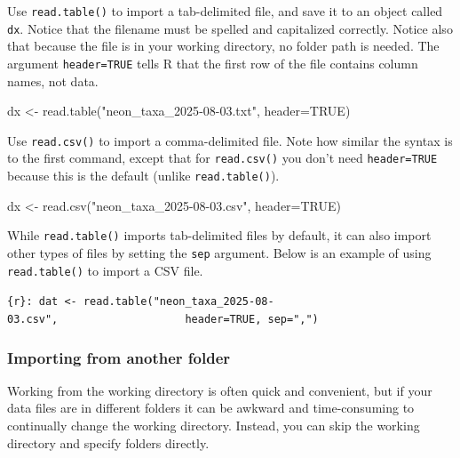 \documentclass[
  13,
  letterpaper,
]{report}
\newenvironment{Shaded}{\begin{snugshade}}{\end{snugshade}}
\newcommand{\AttributeTok}[1]{\textcolor[rgb]{0.40,0.45,0.13}{#1}}
\newcommand{\ConstantTok}[1]{\textcolor[rgb]{0.56,0.35,0.01}{#1}}
\newcommand{\FunctionTok}[1]{\textcolor[rgb]{0.28,0.35,0.67}{#1}}
\newcommand{\NormalTok}[1]{\textcolor[rgb]{0.00,0.23,0.31}{#1}}
\newcommand{\OtherTok}[1]{\textcolor[rgb]{0.00,0.23,0.31}{#1}}
\newcommand{\StringTok}[1]{\textcolor[rgb]{0.13,0.47,0.30}{#1}}
\begin{document}
Use \texttt{read.table()} to import a tab-delimited file, and save it to
an object called \texttt{dx}. Notice that the filename must be spelled
and capitalized correctly. Notice also that because the file is in your
working directory, no folder path is needed. The argument
\texttt{header=TRUE} tells R that the first row of the file contains
column names, not data.

\begin{Shaded}
\begin{Highlighting}[]
\NormalTok{dx }\OtherTok{\textless{}{-}} \FunctionTok{read.table}\NormalTok{(}\StringTok{"neon\_taxa\_2025{-}08{-}03.txt"}\NormalTok{, }\AttributeTok{header=}\ConstantTok{TRUE}\NormalTok{)}
\end{Highlighting}
\end{Shaded}

Use \texttt{read.csv()} to import a comma-delimited file. Note how
similar the syntax is to the first command, except that for
\texttt{read.csv()} you don't need \texttt{header=TRUE} because this is
the default (unlike \texttt{read.table()}).

\begin{Shaded}
\begin{Highlighting}[]
\NormalTok{dx }\OtherTok{\textless{}{-}} \FunctionTok{read.csv}\NormalTok{(}\StringTok{"neon\_taxa\_2025{-}08{-}03.csv"}\NormalTok{, }\AttributeTok{header=}\ConstantTok{TRUE}\NormalTok{)}
\end{Highlighting}
\end{Shaded}

While \texttt{read.table()} imports tab-delimited files by default, it
can also import other types of files by setting the \texttt{sep}
argument. Below is an example of using \texttt{read.table()} to import a
CSV file.

\texttt{\{r\}:\ dat\ \textless{}-\ read.table("neon\_taxa\_2025-08-03.csv",\ \ \ \ \ \ \ \ \ \ \ \ \ \ \ \ \ \ \ \ header=TRUE,\ sep=",")}

\subsubsection{Importing from another
folder}\label{importing-from-another-folder}

Working from the working directory is often quick and convenient, but if
your data files are in different folders it can be awkward and
time-consuming to continually change the working directory. Instead, you
can skip the working directory and specify folders directly.
\end{document}
